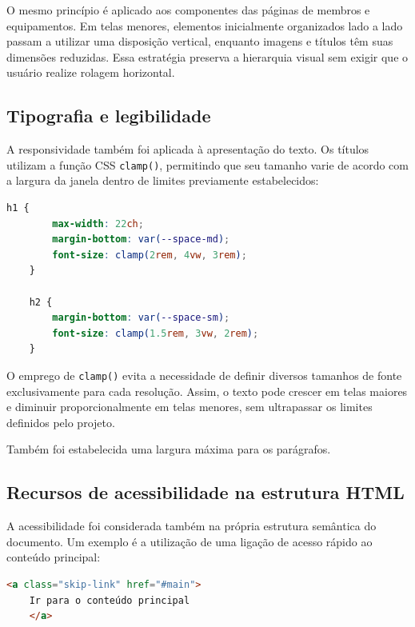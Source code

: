 O mesmo princípio é aplicado aos componentes das páginas de membros e equipamentos. Em telas menores, elementos inicialmente organizados lado a lado passam a utilizar uma disposição vertical, enquanto imagens e títulos têm suas dimensões reduzidas. Essa estratégia preserva a hierarquia visual sem exigir que o usuário realize rolagem horizontal.

\vspace{5mm}
\subsection{Tipografia e legibilidade}

A responsividade também foi aplicada à apresentação do texto. Os títulos utilizam a função CSS \texttt{clamp()}, permitindo que seu tamanho varie de acordo com a largura da janela dentro de limites previamente estabelecidos:

\begin{lstlisting}[language=CSS, caption={Dimensionamento adaptativo dos títulos.}, label={lst:clamp}]
	h1 {
		max-width: 22ch;
		margin-bottom: var(--space-md);
		font-size: clamp(2rem, 4vw, 3rem);
	}
	
	h2 {
		margin-bottom: var(--space-sm);
		font-size: clamp(1.5rem, 3vw, 2rem);
	}
\end{lstlisting}

O emprego de \texttt{clamp()} evita a necessidade de definir diversos tamanhos de fonte exclusivamente para cada resolução. Assim, o texto pode crescer em telas maiores e diminuir proporcionalmente em telas menores, sem ultrapassar os limites definidos pelo projeto.

Também foi estabelecida uma largura máxima para os parágrafos.

\vspace{5mm}
\subsection{Recursos de acessibilidade na estrutura HTML}

A acessibilidade foi considerada também na própria estrutura semântica do documento. Um exemplo é a utilização de uma ligação de acesso rápido ao conteúdo principal:

\begin{lstlisting}[language=HTML, caption={Mecanismo de acesso direto ao conteúdo principal.}, label={lst:skiplink}]
	<a class="skip-link" href="#main">
	Ir para o conteúdo principal
	</a>
\end{lstlisting}

